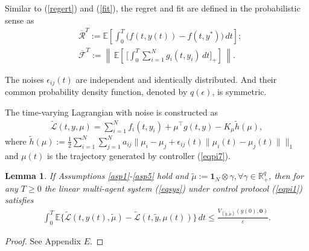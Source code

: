 \documentclass[final,5p,times,twocolumn,authoryear]{elsarticle}
\newtheorem{lemma}{ {Lemma}}
\begin{document}
	Similar to (\ref{regert}) and (\ref{fit}), the regret and fit are defined in the probabilistic sense as
	\begin{align}
		&\overline{\mathcal{R}}^T:=\mathbb{E}\left[\int_{0}^{T} \Big(f(t,y(t))-f(t,y^*)\Big)\,dt\right];\label{regertn}\\
		&\overline{\mathcal{F}}^T:=\left\|\,\mathbb{E}\left[\,\Big[\int_{0}^{T} \sum_{i=1}^{N}g_{i}(t, y_i) \,dt\Big]_+\right]\,\right\|.\label{fitn}
	\end{align}
	
	
	
	
	\begin{assumption}\label{asp5}
		The noises $\epsilon_{ij}(t)$ are independent and identically distributed. And their common probability density function,  denoted by $q(\epsilon)$, is symmetric.
	\end{assumption}
	
	
	
		The time-varying Lagrangian with noise is constructed as
		\begin{align}
			\mathcal{\tilde{L}}(t,y,\mu)=\sum_{i=1}^{N}f_i(t,y_i)+\mu^\top g(t,y) - K_\mu \tilde{h}(\mu),\label{lan}
		\end{align}
		where $\tilde{h}(\mu):= \frac{1}{2}\sum_{i=1}^N\sum_{j=1}^N a_{ij}\big\|\mu_i-\mu_j +\epsilon_{ij}(t)\|\mu_i(t)-\mu_j(t)\|\big\|_1$ and $\mu(t)$  is the trajectory generated by controller (\ref{eqpi7}).
		
		
		\begin{lemma}\label{lemma5}
			If Assumptions \ref{asp1}-\ref{asp5} hold and $\tilde{\mu}:= \boldsymbol1_N \otimes \gamma, \forall \gamma\in \mathbb{R}_+^q$, then for any $T\ge0$ the linear multi-agent system (\ref{eqsys}) under control protocol (\ref{eqpi1}) satisfies
			\begin{align}
				\int_{0}^{T} \mathbb{E}\big\{ \mathcal{\tilde{L}}(t,y(t),\tilde{\mu}) - \mathcal{\tilde{L}}(t,\tilde y,\mu(t)) \big\} \,dt\le\frac{V_{(\tilde{y}, \tilde{\mu})}(y(0), \boldsymbol{0})}{\varepsilon}.\label{ln1}
			\end{align}
		\end{lemma}
	
	\begin{proof}
		See Appendix $E$.
	\end{proof}	
		
\end{document}
